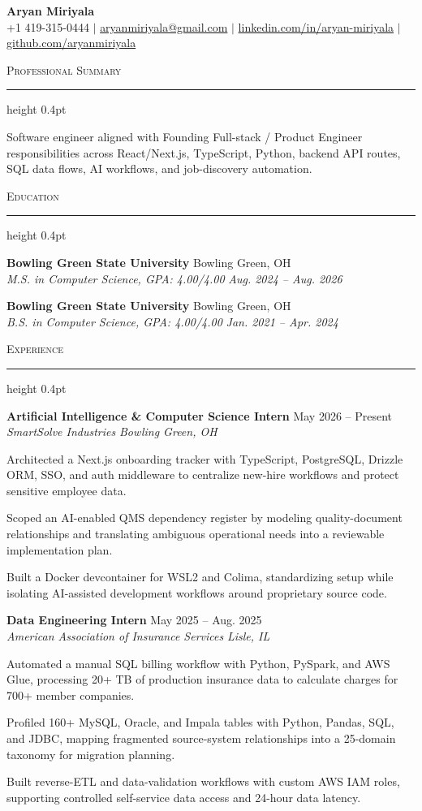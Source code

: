 \documentclass[letterpaper,11pt]{article}
\newcommand{\resumesection}[1]{%
  \par\vspace{2pt}%
  {\large\scshape #1}\par\vspace{2pt}%
  \hrule height 0.4pt\vspace{2pt}%
}
\newcommand{\resumeSubheading}[4]{
  \textbf{#1} \hfill #2\\
  \textit{#3} \hfill \textit{#4}
}
\begin{document}
\begin{center}
  {\LARGE \textbf{Aryan Miriyala}}\\[-1pt]
  \small
  +1 419-315-0444 $|$
  \href{mailto:aryanmiriyala@gmail.com}{aryanmiriyala@gmail.com} $|$
  \href{https://www.linkedin.com/in/aryan-miriyala-7788a21b6/}{linkedin.com/in/aryan-miriyala} $|$
  \href{https://github.com/aryanmiriyala}{github.com/aryanmiriyala}
\end{center}\vspace{-10pt}

\resumesection{Professional Summary}
Software engineer aligned with Founding Full-stack / Product Engineer responsibilities across React/Next.js, TypeScript, Python, backend API routes, SQL data flows, AI workflows, and job-discovery automation.

\resumesection{Education}
\resumeSubheading
{Bowling Green State University}{Bowling Green, OH}
{M.S. in Computer Science, GPA: 4.00/4.00}{Aug. 2024 -- Aug. 2026}

\resumeSubheading
{Bowling Green State University}{Bowling Green, OH}
{B.S. in Computer Science, GPA: 4.00/4.00}{Jan. 2021 -- Apr. 2024}

\resumesection{Experience}
\resumeSubheading
{Artificial Intelligence \& Computer Science Intern}{May 2026 -- Present}
{SmartSolve Industries}{Bowling Green, OH}
\begin{tightitemize}
  \item Architected a Next.js onboarding tracker with TypeScript, PostgreSQL, Drizzle ORM, SSO, and auth middleware to centralize new-hire workflows and protect sensitive employee data.
  \item Scoped an AI-enabled QMS dependency register by modeling quality-document relationships and translating ambiguous operational needs into a reviewable implementation plan.
  \item Built a Docker devcontainer for WSL2 and Colima, standardizing setup while isolating AI-assisted development workflows around proprietary source code.
\end{tightitemize}

\resumeSubheading
{Data Engineering Intern}{May 2025 -- Aug. 2025}
{American Association of Insurance Services}{Lisle, IL}
\begin{tightitemize}
  \item Automated a manual SQL billing workflow with Python, PySpark, and AWS Glue, processing 20+ TB of production insurance data to calculate charges for 700+ member companies.
  \item Profiled 160+ MySQL, Oracle, and Impala tables with Python, Pandas, SQL, and JDBC, mapping fragmented source-system relationships into a 25-domain taxonomy for migration planning.
  \item Built reverse-ETL and data-validation workflows with custom AWS IAM roles, supporting controlled self-service data access and 24-hour data latency.
\end{tightitemize}
\end{document}
